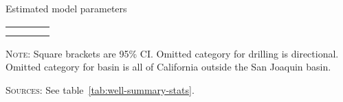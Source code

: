 \begin{threeparttable}

\caption{Estimated model parameters}

\label{tab:model-param}
\begin{tabularx}{0.97\textwidth}{l d d d}
\toprule
&  &  &  \\
\midrule
\\
\midrule
\\
\bottomrule
\end{tabularx}
\begin{tablenotes}
\item \textsc{Note:}
Square brackets are 95\% CI.
Omitted category for drilling is directional.
Omitted category for basin is all of California outside the San Joaquin basin.

\textsc{Sources:} See table~\ref{tab:well-summary-stats}.
\end{tablenotes}
\end{threeparttable}
